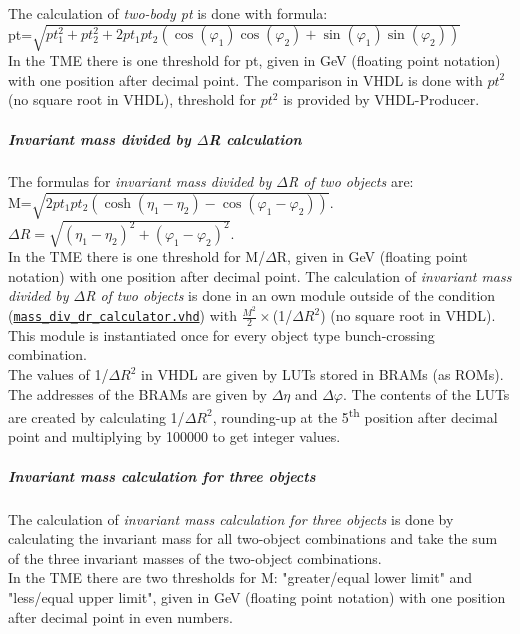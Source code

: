 The calculation of \textit{two-body pt} is done with formula:\\

pt=$\sqrt{pt^2_1 + pt^2_2 + 2  pt_1 pt_2 (\cos(\varphi_1) \cos(\varphi_2) + \sin(\varphi_1) \sin(\varphi_2))}$\\

In the TME there is one threshold for pt, given in GeV (floating point notation) with one position after decimal point.
The comparison in VHDL is done with ${pt^2}$ (no square root in VHDL), threshold for ${pt^2}$ is provided by VHDL-Producer.

\subparagraph{Invariant mass divided by $\Delta$R calculation}
\label{sec:gtl:inv_mass_div_dr_calculation}

The formulas for \textit{invariant mass divided by $\Delta$R of two objects} are:\\

M=$\sqrt{2 pt_1  pt_2 (\cosh(\eta_1-\eta_2)-\cos(\varphi_1-\varphi_2))}$.\\

$\Delta$$R=\sqrt{(\eta_1-\eta_2)^2+(\varphi_1-\varphi_2)^2}$.\\

In the TME there is one threshold for M/$\Delta$R, given in GeV (floating point notation) with one position after decimal point.
The calculation of \textit{invariant mass divided by $\Delta$R of two objects} is done in an own module outside of the condition (\href{https://github.com/cms-l1-globaltrigger/mp7_ugt_legacy/tree/master/firmware/hdl/gt_mp7_core/gtl_fdl_wrapper/gtl/mass_div_dr_calculator.vhd}{\texttt{mass\_div\_dr\_calculator.vhd}}) with $\frac{M^2}{2}\times$(1/$\Delta$$R^2$) (no square root in VHDL). This module is instantiated once for every object type bunch-crossing combination.\\  
The values of 1/$\Delta$$R^2$ in VHDL are given by LUTs stored in BRAMs (as ROMs). The addresses of the BRAMs are given by $\Delta\eta$ and $\Delta\varphi$. The contents of the LUTs are created by calculating 1/$\Delta$$R^2$, rounding-up at the 5\textsuperscript{th} position after decimal point and multiplying by 100000 to get integer values.\\

\subparagraph{Invariant mass calculation for three objects}
\label{sec:gtl:inv_mass_3_obj_calculation}

The calculation of \textit{invariant mass calculation for three objects} is done by calculating the invariant mass for all two-object combinations and take the sum of the three invariant masses of the two-object combinations.\\
In the TME there are two thresholds for M: "greater/equal lower limit" and "less/equal upper limit", given in GeV (floating point notation) with one position after decimal point in even numbers.

